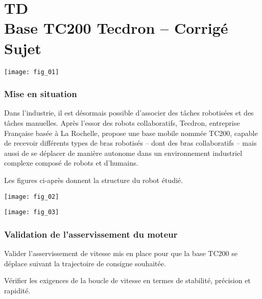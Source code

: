 \chapter*{TD  \\ 
Base TC200 Tecdron -- \ifprof Corrigé \else Sujet \fi}


\iflivret {} \else
\ifprof  {} \else \fi
\fi
\setcounter{question}{0}

\begin{marginfigure}
\centering
\texttt{[image: fig\_01]}
\end{marginfigure}



\subsection*{Mise en situation}

Dans l’industrie, il est désormais possible d’associer des tâches robotisées et des tâches manuelles. Après l’essor
des robots collaboratifs, Tecdron, entreprise Française basée à La Rochelle, propose une base mobile nommée
TC200, capable de recevoir différents types de bras robotisés -- dont des bras collaboratifs -- mais aussi de
se déplacer de manière autonome dans un environnement industriel complexe composé de robots et d’humains.

Les figures ci-après donnent la structure du robot étudié. 

\begin{marginfigure}
\centering
\texttt{[image: fig\_02]}

\texttt{[image: fig\_03]}
\end{marginfigure}




\subsection*{Validation de l'asservissement du moteur}
\begin{obj}
Valider l’asservissement de vitesse mis en place pour que la base TC200 se déplace suivant la trajectoire
de consigne souhaitée.

Vérifier les exigences de la boucle de vitesse en termes de stabilité, précision et rapidité.
\end{obj}


